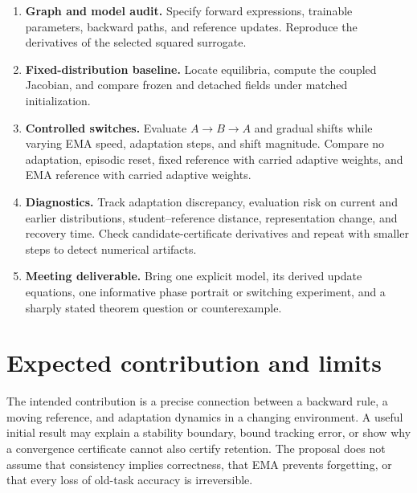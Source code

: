 \documentclass[11pt,a4paper]{article}
\newif\ifdraftnotes
\newcommand{\draftnote}[1]{\ifdraftnotes\par\smallskip
  {\small\color{gray}\noindent\textit{To develop:} #1\par}\smallskip\fi}
\begin{document}
\begin{enumerate}
 \item \textbf{Graph and model audit.} Specify forward expressions, trainable
 parameters, backward paths, and reference updates. Reproduce the derivatives
 of the selected squared surrogate.
 \item \textbf{Fixed-distribution baseline.} Locate equilibria, compute the
 coupled Jacobian, and compare frozen and detached fields under matched
 initialization.
 \item \textbf{Controlled switches.} Evaluate $A\to B\to A$ and gradual
 shifts while varying EMA speed, adaptation steps, and shift magnitude.
 Compare no adaptation, episodic reset, fixed reference with carried
 adaptive weights, and EMA reference with carried adaptive weights.
 \item \textbf{Diagnostics.} Track adaptation discrepancy, evaluation risk
 on current and earlier distributions, student--reference distance,
 representation change, and recovery time. Check candidate-certificate
 derivatives and repeat with smaller steps to detect numerical artifacts.
 \item \textbf{Meeting deliverable.} Bring one explicit model, its derived
 update equations, one informative phase portrait or switching experiment,
 and a sharply stated theorem question or counterexample.
\end{enumerate}
\draftnote{After the toy result is understood, select one small neural
experiment and audit related work to identify what is new. Record memory,
data-access, and compute budgets so comparisons answer the same question.}

\section{Expected contribution and limits}
The intended contribution is a precise connection between a backward rule,
a moving reference, and adaptation dynamics in a changing environment.
A useful initial result may explain a stability boundary, bound tracking
error, or show why a convergence certificate cannot also certify retention.
The proposal does not assume that consistency implies correctness, that EMA
prevents forgetting, or that every loss of old-task accuracy is irreversible.
\draftnote{Replace these intended outcomes with evidence after the first
analysis. Separate background results, reproduced calculations, and new
findings.}

\medskip
{}
\end{document}
